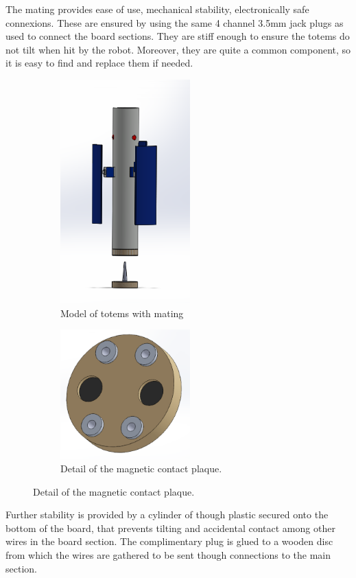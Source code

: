 \documentclass[a4paper,twoside]{book}
\begin{document}
The mating provides ease of use, mechanical stability, electronically safe connexions. These are ensured by using the same 4 channel 3.5mm jack plugs as used to connect the board sections. They are stiff enough to ensure the totems do not tilt when hit by the robot. Moreover, they are quite a common component, so it is easy to find and replace them if needed.

\begin{figure}
    \begin{subfigure}{6cm}
    \includegraphics[width=5cm]{img/totem_nuovo2}
    \captionsetup{width=4cm}
    \caption{Model of totems with mating}
  \end{subfigure}
  \begin{subfigure}{6cm}
    \includegraphics[width=5cm]{img/placca_contatto}
    \captionsetup{width=4cm}
    \caption{Detail of the magnetic contact plaque.}
    \end{subfigure}
\end{figure}

Further stability is provided by a cylinder of though plastic secured onto the bottom of the board, that prevents tilting and accidental contact among other wires in the board section. The complimentary plug is glued to a wooden disc from which the wires are gathered to be sent though connections to the main section.
\end{document}

